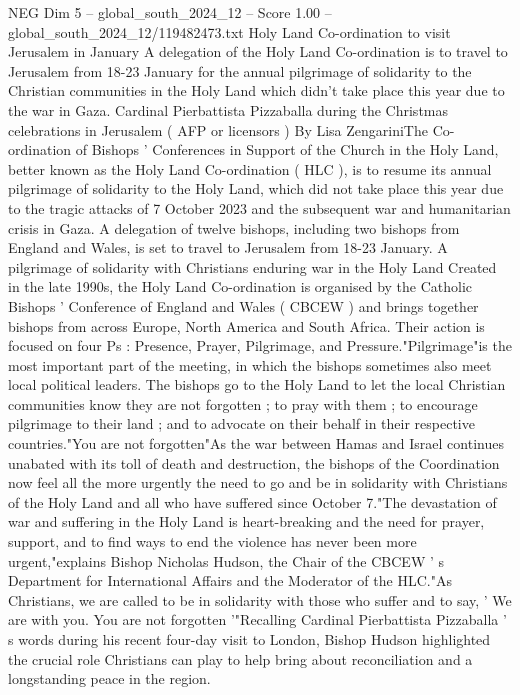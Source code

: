 \begin{textsample}{NEG Dim 5 – global\_south\_2024\_12 – Score 1.00 – global\_south\_2024\_12/119482473.txt}  \label{ex:f5_neg_401}
Holy Land Co-ordination to visit Jerusalem in January A delegation of the Holy Land Co-ordination is to travel to Jerusalem from 18-23 January for the annual pilgrimage of solidarity to the Christian communities in the Holy Land which didn't take place this year due to the war in Gaza.
Cardinal Pierbattista Pizzaballa during the Christmas celebrations in Jerusalem ( AFP or licensors ) By Lisa ZengariniThe Co-ordination of Bishops ' Conferences in Support of the Church in the Holy Land, better known as the Holy Land Co-ordination ( HLC ), is to resume its annual pilgrimage of solidarity to the Holy Land, which did not take place this year due to the tragic attacks of 7 October 2023 and the subsequent war and humanitarian crisis in Gaza.
A delegation of twelve bishops, including two bishops from England and Wales, is set to travel to Jerusalem from 18-23 January.
A pilgrimage of solidarity with Christians enduring war in the Holy Land Created in the late 1990s, the Holy Land Co-ordination is organised by the Catholic Bishops ' Conference of England and Wales ( CBCEW ) and brings together bishops from across Europe, North America and South Africa.
Their action is focused on four Ps : Presence, Prayer, Pilgrimage, and Pressure."Pilgrimage"is the most important part of the meeting, in which the bishops sometimes also meet local political leaders.
The bishops go to the Holy Land to let the local Christian communities know they are not forgotten ; to pray with them ; to encourage pilgrimage to their land ; and to advocate on their behalf in their respective countries."You are not forgotten"As the war between Hamas and Israel continues unabated with its toll of death and destruction, the bishops of the Coordination now feel all the more urgently the need to go and be in solidarity with Christians of the Holy Land and all who have suffered since October 7."The devastation of war and suffering in the Holy Land is heart-breaking and the need for prayer, support, and to find ways to end the violence has never been more urgent,"explains Bishop Nicholas Hudson, the Chair of the CBCEW ' s Department for International Affairs and the Moderator of the HLC."As Christians, we are called to be in solidarity with those who suffer and to say, ' We are with you.
You are not forgotten '"Recalling Cardinal Pierbattista Pizzaballa ' s words during his recent four-day visit to London, Bishop Hudson highlighted the crucial role Christians can play to help bring about reconciliation and a longstanding peace in the region.

\end{textsample}
